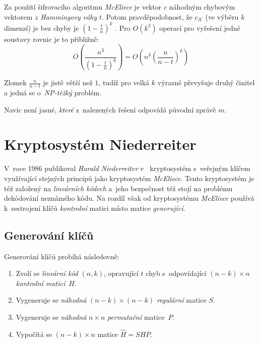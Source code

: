 \documentclass[thesis=M,czech,hidelinks]{FITthesis}[2012/06/26]
\newcommand{\0}{{\textcolor[gray]{0.80}{0}}}
\begin{document}
Za použití šifrovacího algoritmu \emph{McEliece} je vektor $c$ 
náhodným chybovým vektorem $z$ \emph{Hammingovy váhy} $t$. Potom
pravděpodobnost, že $c_{\mathcal{K}}$ (ve výběru $k$ dimenzí) je bez chyby je
$\left(1-\frac{t}{n}\right)^k$ \cite{McEliece}. Pro $O\left(k^3\right)$ operací
pro vyřešení jedné soustavy rovnic je to přibližně:
$$
    O\left( \frac{n^3}{\left(1-\frac{t}{n}\right)^k} \right) =
    O\left( n^3 \left(\frac{n}{n-t}\right)^k \right)
$$

Zlomek $\frac{n}{n-t}$ je jistě větší než $1$, tudíž pro velká $k$ výrazně
převyšuje druhý činitel a jedná se o~\emph{NP-těžký} problém.

Navíc není jasné, \emph{které} z~nalezených řešení odpovídá původní zprávě $m$.

\section{Kryptosystém Niederreiter}

V~roce 1986 publikoval \emph{Harald Niederreiter} v~\cite{Niederreiter}
kryptosystém s~veřejným klíčem využívající stejných principů jako kryptosystém
\emph{McEliece}. Tento kryptosystém je též založený na \emph{lineárních kódech}
a~jeho bezpečnost též stojí na problému dekódování neznámého kódu. Na rozdíl
však od kryptosystému \emph{McEliece} používá k~sestrojení klíčů
\emph{kontrolní} matici místo matice \emph{generující}.

\subsection{Generování klíčů}

Generování klíčů probíhá následovně:

\begin{enumerate}
    \item Zvolí se \emph{lineární kód} $(n,k)$, opravující $t$ chyb
        s~odpovídající $(n-k) \times n$ \emph{kontrolní maticí}~$H$.
    \item Vygeneruje se \emph{náhodná} $(n-k) \times (n-k)$ \emph{regulární}
        matice $S$.
    \item Vygeneruje se \emph{náhodná} $n \times n$ \emph{permutační}
        matice~$P$.
    \item Vypočítá se $(n-k) \times n$ matice $\hat{H} = S H P$.
\end{enumerate}
\end{document}
